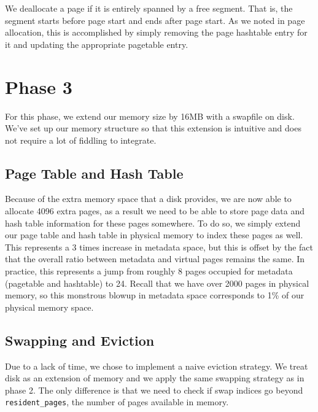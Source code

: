 \documentclass{article}
\begin{document}
We deallocate a page if it is entirely spanned by a free segment. That is, the segment starts before page start and ends after page start. As we noted in page allocation, this is accomplished by simply removing the page hashtable entry for it and updating the appropriate pagetable entry.

\section{Phase 3}
For this phase, we extend our memory size by 16MB with a swapfile on disk. We've set up our memory structure so that this extension is intuitive and does not require a lot of fiddling to integrate.

\subsection{Page Table and Hash Table}
Because of the extra memory space that a disk provides, we are now able to allocate 4096 extra pages, as a result we need to be able to store page data and hash table information for these pages somewhere. To do so, we simply extend our page table and hash table in physical memory to index these pages as well. This represents a 3 times increase in metadata space, but this is offset by the fact that the overall ratio between metadata and virtual pages remains the same. In practice, this represents a jump from roughly 8 pages occupied for metadata (pagetable and hashtable) to 24. Recall that we have over 2000 pages in physical memory, so this monstrous blowup in metadata space corresponds to 1\% of our physical memory space.

\subsection{Swapping and Eviction}
Due to a lack of time, we chose to implement a naive eviction strategy. We treat disk as an extension of memory and we apply the same swapping strategy as in phase 2. The only difference is that we need to check if swap indices go beyond \verb|resident_pages|, the number of pages available in memory.
\end{document}
